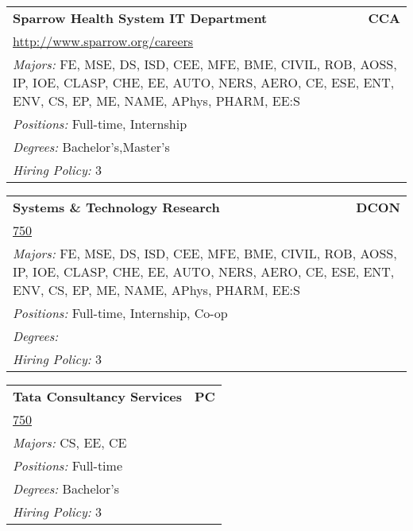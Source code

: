 \documentclass[twoside]{article}
\begin{document}
\begin{center}
\begin{multicols}{3}
\begin{FlushLeft}
\begin{minipage}{.9\columnwidth}\begin{tabularx}{.95\columnwidth}{Xr}
                 {\Large\bf Sparrow Health System IT Department} & {\Large\bf CCA}\\
    \multicolumn{2}{p{.95\columnwidth}}{\url{http://www.sparrow.org/careers}}\\
    \multicolumn{2}{p{.95\columnwidth}}{\emph{Majors:} FE, MSE, DS, ISD, CEE, MFE, BME, CIVIL, ROB, AOSS, IP, IOE, CLASP, CHE, EE, AUTO, NERS, AERO, CE, ESE, ENT, ENV, CS, EP, ME, NAME, APhys, PHARM, EE:S}\\
    \multicolumn{2}{p{.95\columnwidth}}{\emph{Positions:} Full-time, Internship}\\
    \multicolumn{2}{p{.95\columnwidth}}{\emph{Degrees:} Bachelor's,Master's}\\
    \multicolumn{2}{p{.95\columnwidth}}{\emph{Hiring Policy:} 3}\\
    \end{tabularx}
    
\end{minipage}
 
\begin{minipage}{.9\columnwidth}\begin{tabularx}{.95\columnwidth}{Xr}
                 {\Large\bf Systems \& Technology Research} & {\Large\bf DCON}\\
    \multicolumn{2}{p{.95\columnwidth}}{\url{750}}\\
    \multicolumn{2}{p{.95\columnwidth}}{\emph{Majors:} FE, MSE, DS, ISD, CEE, MFE, BME, CIVIL, ROB, AOSS, IP, IOE, CLASP, CHE, EE, AUTO, NERS, AERO, CE, ESE, ENT, ENV, CS, EP, ME, NAME, APhys, PHARM, EE:S}\\
    \multicolumn{2}{p{.95\columnwidth}}{\emph{Positions:} Full-time, Internship, Co-op}\\
    \multicolumn{2}{p{.95\columnwidth}}{\emph{Degrees:} }\\
    \multicolumn{2}{p{.95\columnwidth}}{\emph{Hiring Policy:} 3}\\
    \end{tabularx}
    
\end{minipage}
 
\begin{minipage}{.9\columnwidth}\begin{tabularx}{.95\columnwidth}{Xr}
                 {\Large\bf Tata Consultancy Services} & {\Large\bf PC}\\
    \multicolumn{2}{p{.95\columnwidth}}{\url{750}}\\
    \multicolumn{2}{p{.95\columnwidth}}{\emph{Majors:} CS, EE, CE}\\
    \multicolumn{2}{p{.95\columnwidth}}{\emph{Positions:} Full-time}\\
    \multicolumn{2}{p{.95\columnwidth}}{\emph{Degrees:} Bachelor's}\\
    \multicolumn{2}{p{.95\columnwidth}}{\emph{Hiring Policy:} 3}\\
    \end{tabularx}
    

\end{minipage}
\end{FlushLeft}
\end{multicols}
\end{center}
\end{document}

